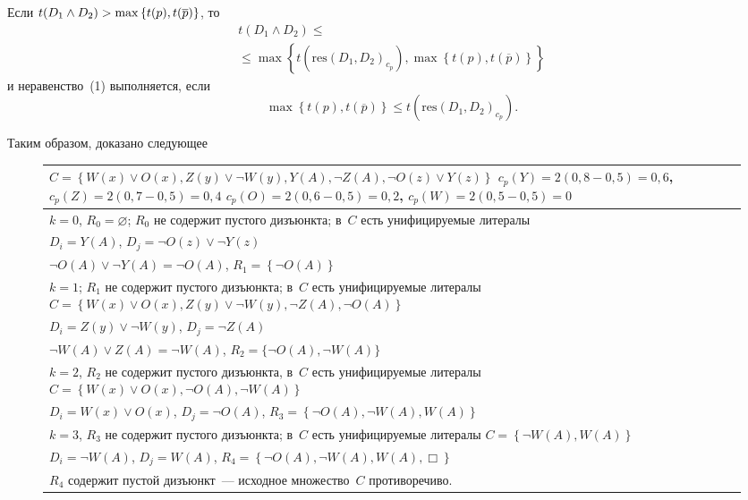 \begin{multicols}{2}
  Если $t(D_1\wedge D_2) \hm> \max \left\{ t(p), t(\overline{p})\right\}$, то
\begin{multline*}
t(D_1\wedge D_2) \leq {}\\
{}\leq
\max\left\{ t\left( \mathrm{res}\left(D_1, D_2\right)_{c_p}\right), \max \left\{ 
t(p), t (\overline{p})\right\}\right\}
\end{multline*}
и неравенство~(1) выполняется, если 
$$
\max \left\{ t(p),t(\overline{p})\right\} 
\leq t\left( \mathrm{res}\left(D_1, D_2\right)_{c_p}\right).
$$
  
  Таким образом, доказано следующее
  
  \begin{figure*}[b] %
\begin{center}
{\small
 \begin{tabular}{|p{124mm}|}
\hline
$C=\left\{ W(x)\vee O(x), Z(y)\vee \neg W(y), Y(A), \neg Z(A), \neg O(z)\vee Y(z)\right\}$\newline
$c_p(Y)=2(0{,}8-0{,}5) =0{,}6$, $c_p(Z)=2(0{,}7- 0{,}5)=0{,}4$\newline
$c_p(O)=2(0{,}6-0{,}5)=0{,}2$, $c_p(W)= 2(0{,}5-0{,}5)=0$\\
\hline
$k=0$, $R_0=\varnothing$; $R_0$ не содержит пустого дизъюнкта; в~$C$ есть унифицируемые 
литералы\\
\hline
$D_i=Y(A)$, $D_j=\neg O(z)\vee \neg Y(z)$ \\
\hline
$\neg O(A)\vee \neg Y(A)=\neg O(A)$, $R_1=\left\{ \neg O(A)\right\}$\\
\hline
$k=1$; $R_1$ не содержит пустого дизъюнкта; в~$C$ есть унифицируемые литералы\newline
$C=\left\{ W(x)\vee O(x), Z(y)\vee \neg W(y), \neg Z(A), \neg O(A)\right\}$\\
\hline
$D_i=Z(y)\vee \neg W(y)$, $D_j=\neg Z(A)$ \\
\hline
$\neg W(A)\vee Z(A) =\neg W(A)$, $R_2=\{ \neg O(A), \neg W(A)\}$ \\
\hline
$k=2$, $R_2$ не содержит пустого дизъюнкта, в~$C$ есть унифицируемые литералы\newline
$C=\left\{ W(x)\vee O(x), \neg O(A), \neg W(A)\right\}$\\
\hline
$D_i=W(x)\vee O(x)$, $D_j=\neg O(A)$, $R_3=\left\{ \neg O(A), \neg W(A), W(A)\right\}$\\
\hline
$k=3$, $R_3$ не содержит пустого дизъюнкта; в~$C$ есть унифицируемые литералы\newline
$C=\left\{ \neg W(A), W(A)\right\}$\\
\hline
$D_i=\neg W(A)$, $D_j=W(A)$, $R_4=\left\{ \neg O(A), \neg W(A), W(A), \Box\right\}$\\
\hline
$R_4$ содержит пустой дизъюнкт~--- исходное множество~$C$ противоречиво.\\
\hline
\end{tabular}
}
\end{center}
\end{figure*}



\end{multicols}
